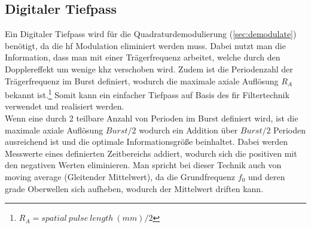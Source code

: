 \subsection{Digitaler Tiefpass}
Ein Digitaler Tiefpass wird für die Quadraturdemodulierung (\autoref{sec:demodulate}) benötigt, da die \ac{hf} Modulation eliminiert werden muss. Dabei nutzt man die Information, dass man mit einer Trägerfrequenz arbeitet, welche durch den Dopplereffekt um wenige \ac{khz} verschoben wird. Zudem ist die Periodenzahl der Trägerfrequenz im Burst definiert, wodurch die maximale axiale Auflösung $R_A$ bekannt ist.\footnote{$R_A=spatial\ pulse\ length\ (mm)/2$} Somit kann ein einfacher Tiefpass auf Basis des \ac{fir} Filtertechnik verwendet und realisiert werden.\\
Wenn eine durch 2 teilbare Anzahl von Perioden im Burst definiert wird, ist die maximale axiale Auflösung $Burst/2$ wodurch ein Addition über $Burst/2$ Perioden ausreichend ist und die optimale Informationsgröße beinhaltet. Dabei werden Messwerte eines definierten Zeitbereichs addiert, wodurch sich die positiven mit den negativen Werten eliminieren. Man spricht bei dieser Technik auch von moving average (Gleitender Mittelwert), da die Grundfrequenz \(f_0\) und deren grade Oberwellen sich aufheben, wodurch der Mittelwert driften kann.

%
%
%
